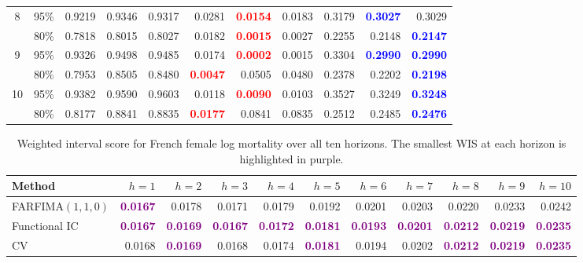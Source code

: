 \begin{longtable}[c]{ccrrrrrrrrr}
\cmidrule(lr){1-11}
8 & 95\% & 0.9219 & 0.9346 & 0.9317 & 0.0281 & \textcolor{red}{\textbf{0.0154}} & 0.0183 & 0.3179 & \textcolor{blue}{\textbf{0.3027}} & 0.3029 \\
 & 80\% & 0.7818 & 0.8015 & 0.8027 & 0.0182 & \textcolor{red}{\textbf{0.0015}} & 0.0027 & 0.2255 & 0.2148 & \textcolor{blue}{\textbf{0.2147}} \\
\cmidrule(lr){1-11}
9 & 95\% & 0.9326 & 0.9498 & 0.9485 & 0.0174 & \textcolor{red}{\textbf{0.0002}} & 0.0015 & 0.3304 & \textcolor{blue}{\textbf{0.2990}} & \textcolor{blue}{\textbf{0.2990}} \\
 & 80\% & 0.7953 & 0.8505 & 0.8480 & \textcolor{red}{\textbf{0.0047}} & 0.0505 & 0.0480 & 0.2378 & 0.2202 & \textcolor{blue}{\textbf{0.2198}} \\
\cmidrule(lr){1-11}
10 & 95\% & 0.9382 & 0.9590 & 0.9603 & 0.0118 & \textcolor{red}{\textbf{0.0090}} & 0.0103 & 0.3527 & 0.3249 & \textcolor{blue}{\textbf{0.3248}} \\
 & 80\% & 0.8177 & 0.8841 & 0.8835 & \textcolor{red}{\textbf{0.0177}} & 0.0841 & 0.0835 & 0.2512 & 0.2485 & \textcolor{blue}{\textbf{0.2476}} \\
\end{longtable}
\endgroup
\endgroup

\begin{table}[!htb]
\centering
\begingroup\fontsize{7}{9}\selectfont
\setlength{\tabcolsep}{2.5pt}
\caption{Weighted interval score for French female log mortality over all ten horizons. The smallest WIS at each horizon is highlighted in purple.}
\label{tab:emp-female-mortality-wis}
\begin{tabular}{lrrrrrrrrrr}
\toprule
Method & $h=1$ & $h=2$ & $h=3$ & $h=4$ & $h=5$ & $h=6$ & $h=7$ & $h=8$ & $h=9$ & $h=10$ \\
\midrule
FARFIMA$(1,1,0)$ & \textcolor{purple}{\textbf{0.0167}} & 0.0178 & 0.0171 & 0.0179 & 0.0192 & 0.0201 & 0.0203 & 0.0220 & 0.0233 & 0.0242 \\
Functional IC & \textcolor{purple}{\textbf{0.0167}} & \textcolor{purple}{\textbf{0.0169}} & \textcolor{purple}{\textbf{0.0167}} & \textcolor{purple}{\textbf{0.0172}} & \textcolor{purple}{\textbf{0.0181}} & \textcolor{purple}{\textbf{0.0193}} & \textcolor{purple}{\textbf{0.0201}} & \textcolor{purple}{\textbf{0.0212}} & \textcolor{purple}{\textbf{0.0219}} & \textcolor{purple}{\textbf{0.0235}} \\
CV & 0.0168 & \textcolor{purple}{\textbf{0.0169}} & 0.0168 & 0.0174 & \textcolor{purple}{\textbf{0.0181}} & 0.0194 & 0.0202 & \textcolor{purple}{\textbf{0.0212}} & \textcolor{purple}{\textbf{0.0219}} & \textcolor{purple}{\textbf{0.0235}} \\
\bottomrule
\end{tabular}
\endgroup
\end{table}


